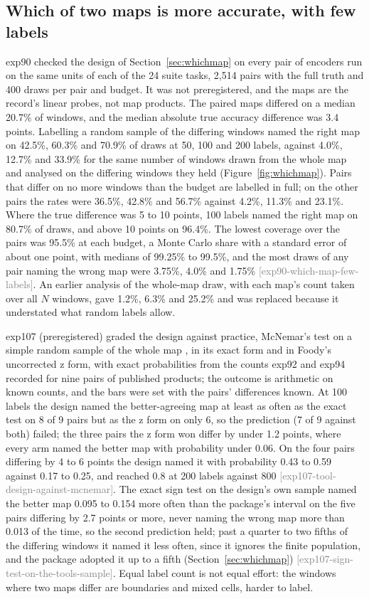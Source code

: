 \documentclass[11pt,a4paper]{article}
\newcommand{\claim}[1]{{\scriptsize\textsf{\textcolor{gray}{[#1]}}}}
\begin{document}
\subsection{Which of two maps is more accurate, with few labels}
\label{sec:res-whichmap}

exp90 checked the design of Section~\ref{sec:whichmap} on every pair of encoders run on the same units of each of the
24 suite tasks, 2,514 pairs with the full truth and 400 draws per pair and budget. It was not preregistered, and the
maps are the record's linear probes, not map products. The paired maps differed on a median 20.7\% of windows, and the
median absolute true accuracy difference was 3.4 points. Labelling a random sample of the differing windows named the
right map on 42.5\%, 60.3\% and 70.9\% of draws at 50, 100 and 200 labels, against 4.0\%, 12.7\% and 33.9\% for the
same number of windows drawn from the whole map and analysed on the differing windows they held
(Figure~\ref{fig:whichmap}). Pairs that differ on no more windows than the budget are labelled in full; on the other
pairs the rates were 36.5\%, 42.8\% and 56.7\% against 4.2\%, 11.3\% and 23.1\%. Where the true difference was 5 to 10
points, 100 labels named the right map on 80.7\% of draws, and above 10 points on 96.4\%. The lowest coverage over the
pairs was 95.5\% at each budget, a Monte Carlo share with a standard error of about one point, with medians of 99.25\%
to 99.5\%, and the most draws of any pair naming the wrong map were 3.75\%, 4.0\% and 1.75\%
\claim{exp90-which-map-few-labels}. An earlier analysis of the whole-map draw, with each map's count taken over all $N$
windows, gave 1.2\%, 6.3\% and 25.2\% and was replaced because it understated what random labels allow.

exp107 (preregistered) graded the design against practice, McNemar's test on a simple random sample of the whole map
\citep{foody2004}, in its exact form and in Foody's uncorrected z form, with exact probabilities from the counts exp92
and exp94 recorded for nine pairs of published products; the outcome is arithmetic on known counts, and the bars were
set with the pairs' differences known. At 100 labels the design named the better-agreeing map at least as often as the
exact test on 8 of 9 pairs but as the z form on only 6, so the prediction (7 of 9 against both) failed; the three pairs
the z form won differ by under 1.2 points, where every arm named the better map with probability under 0.06. On the four
pairs differing by 4 to 6 points the design named it with probability 0.43 to 0.59 against 0.17 to 0.25, and reached 0.8
at 200 labels against 800 \claim{exp107-tool-design-against-mcnemar}. The exact sign test on the design's own sample
named the better map 0.095 to 0.154 more often than the package's interval on the five pairs differing by 2.7 points or
more, never naming the wrong map more than 0.013 of the time, so the second prediction held; past a quarter to two
fifths of the differing windows it named it less often, since it ignores the finite population, and the package adopted
it up to a fifth (Section~\ref{sec:whichmap}) \claim{exp107-sign-test-on-the-tools-sample}. Equal label count is not
equal effort: the windows where two maps differ are boundaries and mixed cells, harder to label.
\end{document}
